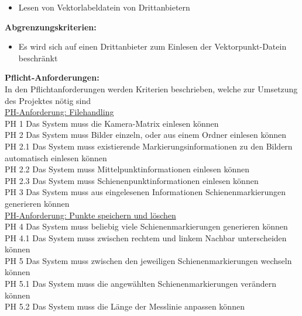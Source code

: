 \documentclass[11pt]{scrartcl}
\begin{document}
\begin{itemize}
	\item Lesen von Vektorlabeldatein von Drittanbietern
\end{itemize}
\textbf{Abgrenzungskriterien:}

\begin{itemize}
	\item Es wird sich auf einen Drittanbieter zum Einlesen der Vektorpunkt-Datein beschränkt
\end{itemize}
\noindent
\textbf{Pflicht-Anforderungen: } 
\\

\noindent
In den Pflichtanforderungen werden Kriterien beschrieben, welche zur Umsetzung des Projektes nötig sind
\\ 

\noindent
\underline{PH-Anforderung: Filehandling}
\\
\noindent
PH 1    Das System muss die Kamera-Matrix einlesen können
\\
\noindent
PH 2  Das System muss Bilder einzeln, oder aus einem Ordner einlesen können
\\
\noindent
PH 2.1 Das System muss existierende Markierungsinformationen zu den Bildern automatisch einlesen können
\\
\noindent
PH 2.2 Das System muss Mittelpunktinformationen einlesen können
\\
\noindent
PH 2.3 Das System muss Schienenpunktinformationen einlesen können
\\
\noindent
PH 3  Das System muss aus eingelesenen Informationen Schienenmarkierungen generieren können
\\

\noindent
\underline{PH-Anforderung: Punkte speichern und löschen}
\\
\noindent
PH 4   Das System muss beliebig viele Schienenmarkierungen generieren können
\\
\noindent
PH 4.1 Das System muss zwischen rechtem und linkem Nachbar unterscheiden können
\\
\noindent
PH 5 Das System muss zwischen den jeweiligen Schienenmarkierungen wechseln können
\\
\noindent
PH 5.1 Das System muss die angewählten Schienenmarkierungen verändern können
\\
\noindent
PH 5.2 Das System muss die Länge der Messlinie anpassen können
\\
\end{document}
